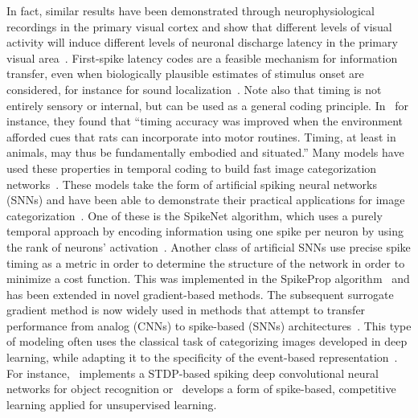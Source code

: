\documentclass[brainsci, %
               review,submit,pdftex,moreauthors
               ]{Definitions/mdpi}
\newcommand{\note}[1]{{\sethlcolor{yellow}\hl{#1}}}
\begin{document}
In fact, similar results have been demonstrated through neurophysiological recordings in the primary visual cortex and show that different levels of visual activity will induce different levels of neuronal discharge latency in the primary visual area~\citep{celebrini_dynamics_1993}. First-spike latency codes are a feasible mechanism for information transfer, even when biologically plausible estimates of stimulus onset are considered, for instance for sound localization~\citep{chase_first-spike_2007}.  Note also that timing is not entirely sensory or internal, but can be used as a general coding principle. In~\citep{safaie_turning_2020} for instance, they found that ``timing accuracy was improved when the environment afforded cues that rats can incorporate into motor routines. Timing, at least in animals, may thus be fundamentally embodied and situated.''  Many models have used these properties in temporal coding to build fast image categorization networks~\citep{gautrais_rate_1998,delorme_spikenet_1999, perrinet_coding_2004}. These models take the form of artificial spiking neural networks (SNNs) and have been able to demonstrate their practical applications for image categorization~\citep{delorme_ultra-rapid_2000}. One of these is the SpikeNet algorithm, which uses a purely temporal approach by encoding information using one spike per neuron by using the rank of neurons' activation~\citep{delorme_spikenet_1999,bonilla_analyzing_2022}. Another class of artificial SNNs use precise spike timing as a metric in order to determine the structure of the network in order to minimize a cost function. This was implemented in the SpikeProp algorithm~\citep{bohte_error-backpropagation_2002} and has been extended in novel gradient-based methods. The subsequent surrogate gradient method is now widely used in methods that attempt to transfer performance from analog (CNNs) to spike-based (SNNs) architectures~\citep{zenke_remarkable_2021}. This type of modeling often uses the classical task of categorizing images developed in deep learning, while adapting it to the specificity of the event-based representation~\citep{goltz_fast_2021}. For instance,~\citep{kheradpisheh_stdp-based_2018} implements a STDP-based spiking deep convolutional neural networks for object recognition or~\citep{tavanaei_representation_2018} develops a form of spike-based, competitive learning applied for unsupervised learning. 
\end{document}
